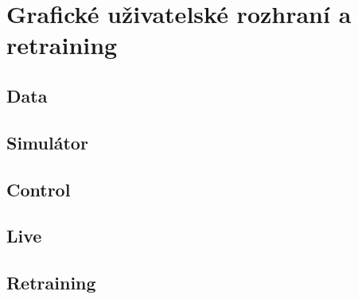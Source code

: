 \chapter{Grafické uživatelské rozhraní a retraining} \label{chap:gui}

\section{Data}
\section{Simulátor}
    \label{sec:sim}
\section{Control}
\section{Live}
    \label{sec:live}
\section{Retraining}